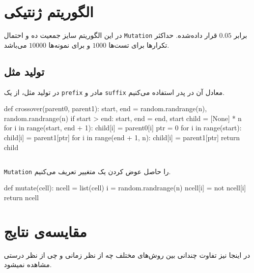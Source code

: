 \section{الگوریتم ژنتیکی}
در این الگوریتم سایز جمعیت ده و احتمال
\verb;Mutation;
برابر
$0.05$
قرار داده‌شده.
حداکثر تکرارها برای تست‌ها 
$1000$
و برای نمونه‌ها
$10000$
می‌باشد.


\subsection{تولید مثل}
در تولید مثل، از یک
\verb;prefix;
مادر و 
\verb;suffix;
معادل آن در پدر استفاده می‌کنیم.

\begin{latin}
\begin{python}
    def crossover(parent0, parent1):
        start, end = random.randrange(n), random.randrange(n)
        if start > end:
            start, end = end, start
        child = [None] * n
        for i in range(start, end + 1):
            child[i] = parent0[i]
        ptr = 0
        for i in range(start):
            child[i] = parent1[ptr]
        for i in range(end + 1, n):
            child[i] = parent1[ptr]
        return child


\end{python}
\end{latin}

\subsection{}
\verb;Mutation;
را حاصل عوض کردن یک متغییر تعریف می‌کنیم.

\begin{latin}
\begin{python}
    def mutate(cell):
        ncell = list(cell)
        i = random.randrange(n)
        ncell[i] = not ncell[i]
        return ncell


\end{python}
\end{latin}
\section{مقایسه‌ی نتایج}
در اینجا نیز تفاوت چندانی بین روش‌های مختلف چه از نظر زمانی و چی از نظر درستی مشاهده نمیشود.


